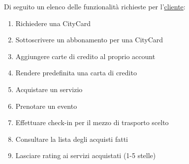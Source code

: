 \vspace{0.5cm}

Di seguito un elenco delle funzionalità richieste per l'\ul{cliente}:
\begin{enumerate}[label=c\arabic*)]
    \item Richiedere una CityCard
    \item Sottoscrivere un abbonamento per una CityCard
    \item Aggiungere carte di credito al proprio account
    \item Rendere predefinita una carta di credito
    \item Acquistare un servizio
    \item Prenotare un evento
    \item Effettuare check-in per il mezzo di trasporto scelto
    \item Consultare la lista degli acquisti fatti
    \item Lasciare rating ai servizi acquistati (1-5 stelle)
\end{enumerate}